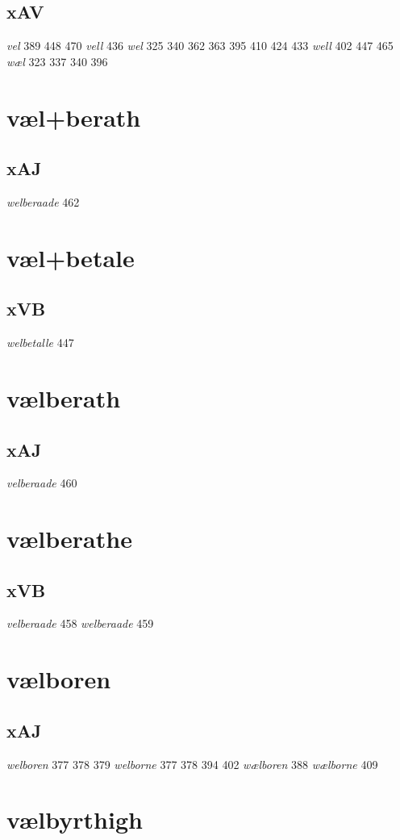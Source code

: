 \documentclass[a4paper,twocolumn]{article}
\begin{document}
\subsection{xAV}
\label{sec:org58409d4}
\emph{vel} 389 448 470 \emph{vell} 436 \emph{wel} 325 340 362 363 395 410 424 433 \emph{well} 402 447 465 \emph{wæl} 323 337 340 396 
\section{væl+berath}
\label{sec:org7700634}
\subsection{xAJ}
\label{sec:orge1721aa}
\emph{welberaade} 462 
\section{væl+betale}
\label{sec:orgb9da78b}
\subsection{xVB}
\label{sec:orgb3eff80}
\emph{welbetalle} 447 
\section{vælberath}
\label{sec:org2a85bef}
\subsection{xAJ}
\label{sec:orgbb10c78}
\emph{velberaade} 460 
\section{vælberathe}
\label{sec:org148e122}
\subsection{xVB}
\label{sec:org6d6d9f6}
\emph{velberaade} 458 \emph{welberaade} 459 
\section{vælboren}
\label{sec:org1553335}
\subsection{xAJ}
\label{sec:orgdbef4e7}
\emph{welboren} 377 378 379 \emph{welborne} 377 378 394 402 \emph{wælboren} 388 \emph{wælborne} 409 
\section{vælbyrthigh}
\label{sec:org185fa81}
\end{document}
